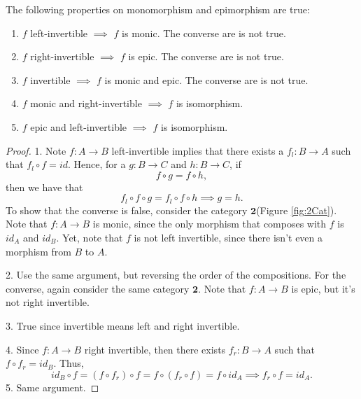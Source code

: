 \begin{proposition}
  The following properties on monomorphism and epimorphism are true:
  \begin{enumerate}[1.]
    \item $f$ left-invertible $\implies$ $f$ is monic. The converse are is not true.
    \item $f$ right-invertible $\implies$ $f$ is epic. The converse are is not true.
    \item $f$ invertible $\implies$ $f$ is monic and epic. The converse are is not true.
    \item $f$ monic and right-invertible $\implies $ $f$ is isomorphism.
    \item $f$ epic and left-invertible $\implies $ $f$ is isomorphism.
  \end{enumerate}
\end{proposition}

\begin{proof}
1. Note $f:A \to B$ left-invertible implies that there exists a $f_l:B \to A$ such that
$f_l \circ f = id$. Hence, for a $g:B\to C$ and $h: B \to C$, if
\begin{displaymath}
  f \circ g = f \circ h,
\end{displaymath}
then we have that
\begin{displaymath}
  f_l \circ f \circ g = f_l \circ f \circ h \implies g =h.
\end{displaymath}
To show that the converse is false, consider the category $\mathbf{2}$(Figure \ref{fig:2Cat}). Note that
$f:A\to B$ is monic, since the only morphism that composes with $f$ is
$id_A$ and $id_B$. Yet, note that $f$ is not left invertible, since there isn't even
a morphism from $B$ to $A$.

2. Use the same argument, but reversing the order of the compositions.
For the converse, again consider the same category $\mathbf{2}$. Note that
$f:A\to B$ is epic, but it's not right invertible.

3. True since invertible means left and right invertible.

4. Since $f:A \to B$ right invertible, then there exists $f_r:B \to A$
such that $f \circ f_r = id_B$. Thus,
\begin{displaymath}
  id_B \circ f = (f \circ f_r) \circ f =
  f \circ (f_r \circ f) =
  f \circ id_A \implies f_r \circ f = id_A.
\end{displaymath}
5. Same argument.
\end{proof}

